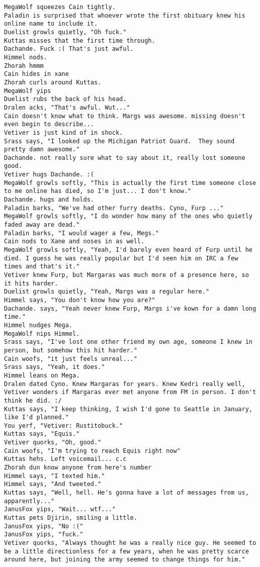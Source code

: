 \begin{verbatim}
MegaWolf squeezes Cain tightly.
Paladin is surprised that whoever wrote the first obituary knew his online name to include it.
Duelist growls quietly, "Oh fuck."
Kuttas misses that the first time through.
Dachande. Fuck :( That's just awful.
Himmel nods.
Zhorah hmmm
Cain hides in xane
Zhorah curls around Kuttas.
MegaWolf yips
Duelist rubs the back of his head.
Dralen acks, "That's awful. Wut..."
Cain doesn't know what to think. Margs was awesome. missing doesn't even begin to describe...
Vetiver is just kind of in shock.
Srass says, "I looked up the Michigan Patriot Guard.  They sound pretty damn awesome."
Dachande. not really sure what to say about it, really lost someone good.
Vetiver hugs Dachande. :(
MegaWolf growls softly, "This is actually the first time someone close to me online has died, so I'm just... I don't know."
Dachande. hugs and holds.
Paladin barks, "We've had other furry deaths. Cyno, Furp ..."
MegaWolf growls softly, "I do wonder how many of the ones who quietly faded away are dead."
Paladin barks, "I would wager a few, Megs."
Cain nods to Xane and noses in as well.
MegaWolf growls softly, "Yeah, I'd barely even heard of Furp until he died. I guess he was really popular but I'd seen him on IRC a few times and that's it."
Vetiver knew Furp, but Margaras was much more of a presence here, so it hits harder.
Duelist growls quietly, "Yeah, Margs was a regular here."
Himmel says, "You don't know how you are?"
Dachande. says, "Yeah never knew Furp, Margs i've kown for a damn long time."
Himmel nudges Mega.
MegaWolf nips Himmel.
Srass says, "I've lost one other friend my own age, someone I knew in person, but somehow this hit harder."
Cain woofs, "it just feels unreal..."
Srass says, "Yeah, it does."
Himmel leans on Mega.
Dralen dated Cyno. Knew Margaras for years. Knew Kedri really well,
Vetiver wonders if Margaras ever met anyone from FM in person. I don't think he did. :/
Kuttas says, "I keep thinking, I wish I'd gone to Seattle in January, like I'd planned."
You yerf, "Vetiver: Rustitobuck."
Kuttas says, "Equis."
Vetiver quorks, "Oh, good."
Cain woofs, "I'm trying to reach Equis right now"
Kuttas hehs. Left voicemail... c.c
Zhorah dun know anyone from here's number
Himmel says, "I texted him."
Himmel says, "And tweeted."
Kuttas says, "Well, hell. He's gonna have a lot of messages from us, apparently..."
JanusFox yips, "Wait... wtf..."
Kuttas pets Djirin, smiling a little.
JanusFox yips, "No :("
JanusFox yips, "fuck."
Vetiver quorks, "Always thought he was a really nice guy. He seemed to be a little directionless for a few years, when he was pretty scarce around here, but joining the army seemed to change things for him."

\end{verbatim}

